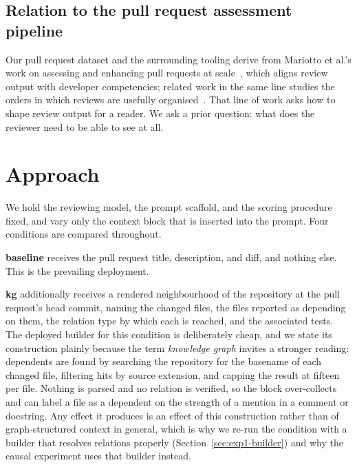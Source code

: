 \documentclass[conference]{IEEEtran}
\begin{document}
\subsection{Relation to the pull request assessment pipeline}
Our pull request dataset and the surrounding tooling derive from Mariotto
et al.'s work on assessing and enhancing pull requests at
scale~\cite{mariotto2025, mariotto2025esem}, which aligns review output with
developer competencies; related work in the same line studies the orders in
which reviews are usefully organised~\cite{bouraffa2025orders}. That line of
work asks how to shape review output for a reader. We ask a prior question:
what does the reviewer need to be able to see at all.

\section{Approach}
\label{sec:approach}

We hold the reviewing model, the prompt scaffold, and the scoring procedure
fixed, and vary only the context block that is inserted into the prompt. Four
conditions are compared throughout.

\textbf{baseline} receives the pull request title, description, and diff, and
nothing else. This is the prevailing deployment.

\textbf{kg} additionally receives a rendered neighbourhood of the repository
at the pull request's head commit, naming the changed files, the files
reported as depending on them, the relation type by which each is reached, and
the associated tests. The deployed builder for this condition is deliberately
cheap, and we state its construction plainly because the term \emph{knowledge
graph} invites a stronger reading: dependents are found by searching the
repository for the basename of each changed file, filtering hits by source
extension, and capping the result at fifteen per file. Nothing is parsed and no
relation is verified, so the block over-collects and can label a file as a
dependent on the strength of a mention in a comment or docstring. Any effect it
produces is an effect of this construction rather than of graph-structured
context in general, which is why we re-run the condition with a builder that
resolves relations properly (Section~\ref{sec:exp1-builder}) and why the causal
experiment uses that builder instead.
\end{document}
